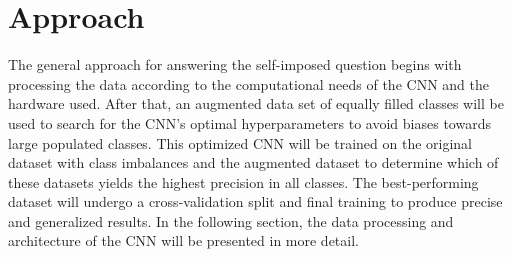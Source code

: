 \section{Approach}
    \label{sec:1}
The general approach for answering the self-imposed question begins with processing the data according to the computational needs of the CNN and the hardware used. After that, an augmented data set of equally filled classes will be used to search for the CNN's optimal hyperparameters to avoid biases towards large populated classes. This optimized CNN will be trained on the original dataset with class imbalances and the augmented dataset to determine which of these datasets yields the highest precision in all classes. The best-performing dataset will undergo a cross-validation split and final training to produce precise and generalized results. In the following section, the data processing and architecture of the CNN will be presented in more detail.
